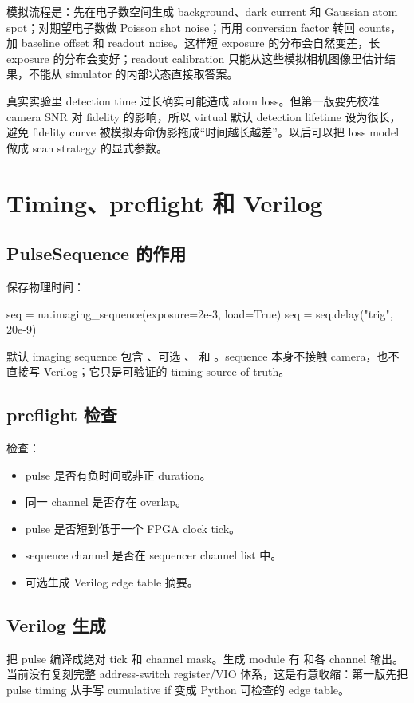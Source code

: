 \documentclass[11pt,oneside,openany]{book}
\begin{document}
模拟流程是：先在电子数空间生成 background、dark current 和 Gaussian atom spot；对期望电子数做 Poisson shot noise；再用 conversion factor 转回 counts，加 baseline offset 和 readout noise。这样短 exposure 的分布会自然变差，长 exposure 的分布会变好；readout calibration 只能从这些模拟相机图像里估计结果，不能从 simulator 的内部状态直接取答案。

\begin{notebox}
真实实验里 detection time 过长确实可能造成 atom loss。但第一版要先校准 camera SNR 对 fidelity 的影响，所以 virtual 默认 detection lifetime 设为很长，避免 fidelity curve 被模拟寿命伪影拖成“时间越长越差”。以后可以把 loss model 做成 scan strategy 的显式参数。
\end{notebox}

\chapter{Timing、preflight 和 Verilog}
\section{PulseSequence 的作用}
 保存物理时间：
\begin{codeblock}[Python]
seq = na.imaging_sequence(exposure=2e-3, load=True)
seq = seq.delay("trig", 20e-9)
\end{codeblock}

默认 imaging sequence 包含 、可选 、 和 。sequence 本身不接触 camera，也不直接写 Verilog；它只是可验证的 timing source of truth。

\section{preflight 检查}
 检查：
\begin{itemize}
  \item pulse 是否有负时间或非正 duration。
  \item 同一 channel 是否存在 overlap。
  \item pulse 是否短到低于一个 FPGA clock tick。
  \item sequence channel 是否在 sequencer channel list 中。
  \item 可选生成 Verilog edge table 摘要。
\end{itemize}

\section{Verilog 生成}
 把 pulse 编译成绝对 tick 和 channel mask。生成 module 有  和各 channel 输出。当前没有复刻完整 address-switch register/VIO 体系，这是有意收缩：第一版先把 pulse timing 从手写 cumulative if 变成 Python 可检查的 edge table。
\end{document}
